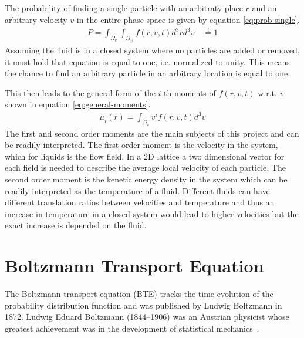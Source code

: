 The probability of finding a single particle with an arbitraty place $r$ and an arbitrary velocity $v$ in the entire phase space is given by equation \ref{eq:prob-single}.
\begin{equation}
  \label{eq:prob-single}
  \begin{aligned}
    P = \int_{\Omega_{r}} \int_{\Omega_{\vec{v}}}  f(r,v,t) d^{3}r d^{3}v \quad \overset{!}{=} 1
  \end{aligned}
\end{equation}
Assuming the fluid is in a closed system where no particles are added or removed, it must hold that equation \href{eq:prob-single} is equal to one, i.e. normalized to unity. 
This means the chance to find an arbitrary particle in an arbitrary location is equal to one.

This then leads to the general form of the $i$-th moments of $ f(r,v,t) $ w.r.t. $ v $ shown in equation \ref{eq:general-moments}.
\begin{equation}
  \label{eq:general-moments}
  \begin{aligned}
    \mu_{i}(r) =\int_{\Omega_{v}}v^{i} f(r,v,t)d^{3}v
  \end{aligned}
\end{equation}
The first and second order moments are the main subjects of this project and can be readily interpreted.
The first order moment is the velocity in the system, which for liquids is the flow field.
In a 2D lattice a two dimensional vector for each field is needed to describe the average local velocity of each particle.
The second order moment is the kenetic energy density in the system which can be readily interpreted as the temperature of a fluid.
Different fluids can have different translation ratios between velocities and temperature and thus an increase in temperature in a closed system would lead to higher velocities but the exact increase is depended on the fluid.


\section{Boltzmann Transport Equation}
The Boltzmann transport equation (BTE) tracks the time evolution of the probability distribution function and was published by Ludwig Boltzmann in 1872. 
Ludwig Eduard Boltzmann (1844–1906) was an Austrian physicist whose greatest achievement was in the development of statistical mechanics~\cite{book}. 

